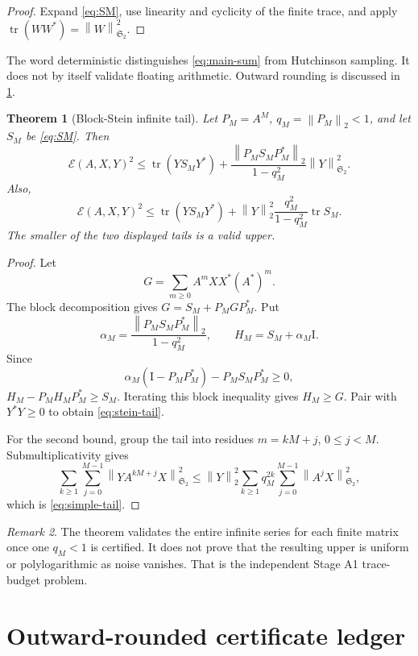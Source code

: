 \documentclass[11pt]{article}
\newtheorem{theorem}{Theorem}[section]
\theoremstyle{remark}
\newtheorem{remark}[theorem]{Remark}
\newcommand{\Id}{\mathrm I}
\newcommand{\cE}{\mathcal E}
\newcommand{\HS}{\mathfrak S_2}
\newcommand{\tr}{\operatorname{tr}}
\newcommand{\norm}[1]{\left\lVert #1\right\rVert}
\begin{document}
\begin{proof}
Expand \eqref{eq:SM}, use linearity and cyclicity of the finite trace, and
apply \(\tr(WW^*)=\norm W_{\HS}^2\).
\end{proof}

The word deterministic distinguishes \eqref{eq:main-sum} from Hutchinson
sampling.  It does not by itself validate floating arithmetic.  Outward
rounding is discussed in \cref{sec:rounding}.

\begin{theorem}[Block-Stein infinite tail]
\label{thm:block-tail}
Let \(P_M=A^M\), \(q_M=\norm{P_M}_2<1\), and let \(S_M\) be
\eqref{eq:SM}.  Then
\begin{equation}
 \boxed{
 \cE(A,X,Y)^2
 \le \tr(YS_MY^*)+
 \frac{\norm{P_MS_MP_M^*}_2}{1-q_M^2}\norm Y_{\HS}^2.}
 \label{eq:stein-tail}
\end{equation}
Also,
\begin{equation}
 \boxed{
 \cE(A,X,Y)^2
 \le \tr(YS_MY^*)+
 \norm Y_2^2\frac{q_M^2}{1-q_M^2}\tr S_M.}
 \label{eq:simple-tail}
\end{equation}
The smaller of the two displayed tails is a valid upper.
\end{theorem}

\begin{proof}
Let
\[
 G=\sum_{m\ge0}A^mXX^*(A^*)^m.
\]
The block decomposition gives \(G=S_M+P_MGP_M^*\).  Put
\[
 \alpha_M=\frac{\norm{P_MS_MP_M^*}_2}{1-q_M^2},
 \qquad H_M=S_M+\alpha_M\Id.
\]
Since
\[
 \alpha_M(\Id-P_MP_M^*)-P_MS_MP_M^*\ge0,
\]
\(H_M-P_MH_MP_M^*\ge S_M\).  Iterating this block inequality gives
\(H_M\ge G\).  Pair with \(Y^*Y\ge0\) to obtain
\eqref{eq:stein-tail}.

For the second bound, group the tail into residues \(m=kM+j\),
\(0\le j<M\).  Submultiplicativity gives
\[
 \sum_{k\ge1}\sum_{j=0}^{M-1}
 \norm{YA^{kM+j}X}_{\HS}^2
 \le \norm Y_2^2\sum_{k\ge1}q_M^{2k}
 \sum_{j=0}^{M-1}\norm{A^jX}_{\HS}^2,
\]
which is \eqref{eq:simple-tail}.
\end{proof}

\begin{remark}
The theorem validates the entire infinite series for each finite matrix once
one \(q_M<1\) is certified.  It does not prove that the resulting upper is
uniform or polylogarithmic as noise vanishes.  That is the independent Stage
A1 trace-budget problem.
\end{remark}

\section{Outward-rounded certificate ledger}
\label{sec:rounding}
\end{document}
